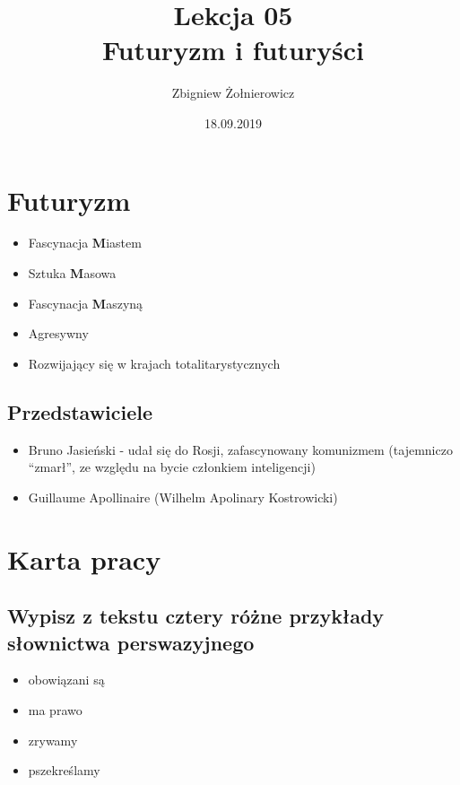 \documentclass[a4paper]{article}
\begin{document}
\title{{\huge Lekcja 05} \\
{\large Futuryzm i futuryści}}
\author{Zbigniew Żołnierowicz}
\date{18.09.2019}
\maketitle
\section{Futuryzm}
\begin{itemize}
    \item Fascynacja \textbf{M}iastem
    \item Sztuka \textbf{M}asowa
    \item Fascynacja \textbf{M}aszyną
    \item Agresywny
    \item Rozwijający się w krajach totalitarystycznych
\end{itemize}
\subsection{Przedstawiciele}
\begin{itemize}
    \item Bruno Jasieński - udał się do Rosji, zafascynowany komunizmem (tajemniczo ``zmarł'', ze względu na bycie członkiem inteligencji)
    \item Guillaume Apollinaire (Wilhelm Apolinary Kostrowicki)
\end{itemize}
\section{Karta pracy}
\subsection{Wypisz z tekstu cztery różne przykłady słownictwa perswazyjnego}
\begin{itemize}
    \item obowiązani są
    \item ma prawo
    \item zrywamy
    \item pszekreślamy
\end{itemize}
\end{document}

